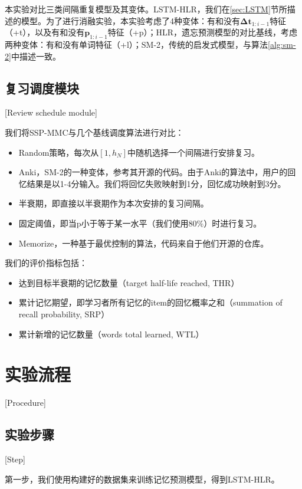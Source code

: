 本实验对比三类间隔重复模型及其变体。LSTM-HLR，我们在\ref{sec:LSTM}节所描述的模型。为了进行消融实验，本实验考虑了4种变体：有和没有$\bm{\Delta t}_{1:i-1}$特征（+t），以及有和没有$\bm p_{1:i-1}$特征（+p）；HLR，遗忘预测模型的对比基线，考虑两种变体：有和没有单词特征（+l）；SM-2，传统的启发式模型，与算法\ref{alg:sm-2}中描述一致。

\subsection{复习调度模块}[Review schedule module]

我们将SSP-MMC与几个基线调度算法进行对比：

\begin{itemize}
    \item Random策略，每次从$[1,h_N]$中随机选择一个间隔进行安排复习。
    \item Anki，SM-2的一种变体，参考其开源的代码。由于Anki的算法中，用户的回忆结果是以1-4分输入。我们将回忆失败映射到1分，回忆成功映射到3分。
    \item 半衰期，即直接以半衰期作为本次安排的复习间隔。
    \item 固定阈值，即当p小于等于某一水平（我们使用80\%）时进行复习。
    \item Memorize\cite{tabibianEnhancingHumanLearning2019}，一种基于最优控制的算法，代码来自于他们开源的仓库。
\end{itemize}

我们的评价指标包括：

\begin{itemize}
    \item 达到目标半衰期的记忆数量（target half-life reached, THR）
    \item 累计记忆期望，即学习者所有记忆的item的回忆概率之和（summation of recall probability, SRP）
    \item 累计新增的记忆数量（words total learned, WTL）
\end{itemize}

\section{实验流程}[Procedure]

\subsection{实验步骤}[Step]

第一步，我们使用构建好的数据集来训练记忆预测模型，得到LSTM-HLR。

